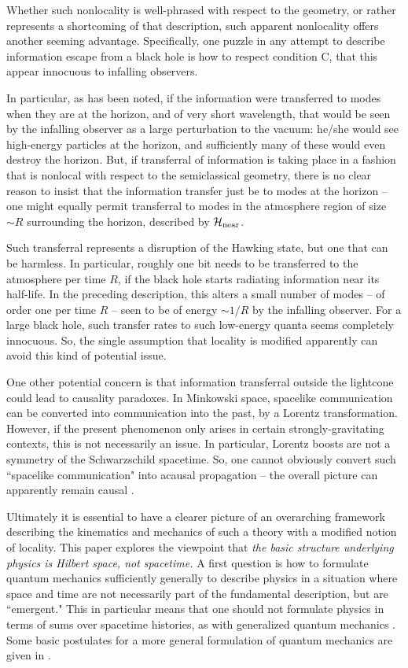 Whether such nonlocality is well-phrased with respect to the geometry, or rather represents a shortcoming of that description, such apparent nonlocality offers another seeming advantage.  Specifically, one puzzle in any attempt to describe information escape from a black hole is how to respect condition C, that this appear innocuous to infalling observers.

In particular, as has been noted, if the information were transferred to modes when they are at the horizon, and of very short wavelength, that would be seen by the infalling observer as a large perturbation to the vacuum:  he/she would see high-energy particles at the horizon, and sufficiently many of these would even destroy the horizon.  But, if transferral of information is taking place in a fashion that is nonlocal with respect to the semiclassical geometry, there is no clear reason to insist that the information transfer just be to modes at the horizon -- one might equally permit transferral to modes in the atmosphere region of size $\sim R$ surrounding the horizon, described by ${{\cal H}_{\rm near}}$.  

Such transferral represents a disruption of the Hawking state, but one that can be harmless.  In particular, roughly one bit needs to be transferred to the atmosphere per time $R$, if the black hole starts radiating information near its half-life.  In the preceding description, this alters a small number of modes -- of order one per time $R$ -- seen to be of energy $\sim 1/R$ by the infalling observer.  For a large black hole, such transfer rates to such low-energy quanta seems completely innocuous.  So, the single assumption that locality is modified apparently can avoid this kind of potential issue.

One other potential concern is that information transferral outside the lightcone could lead to causality paradoxes.  In Minkowski space, spacelike communication can be converted into communication into the past, by a Lorentz transformation.  However, if the present phenomenon only arises in certain strongly-gravitating contexts, this is not necessarily an issue.  In particular, Lorentz boosts are not a symmetry of the Schwarzschild spacetime.  So, one cannot obviously convert such ``spacelike communication" into acausal propagation -- the overall picture can apparently remain causal .



Ultimately it is essential to have a clearer picture of an overarching framework describing the kinematics and mechanics of  such a theory with a modified notion of locality.  This paper explores the viewpoint that {\it the basic structure underlying physics is Hilbert space, not spacetime.}  A first question is how to formulate quantum mechanics sufficiently generally to describe physics in a situation where space and time are not necessarily part of the fundamental description, but are ``emergent."  This in particular means that one should not formulate physics in terms of sums over spacetime histories, as with  generalized quantum mechanics .  Some basic postulates for a more general formulation of quantum mechanics are given in .   

